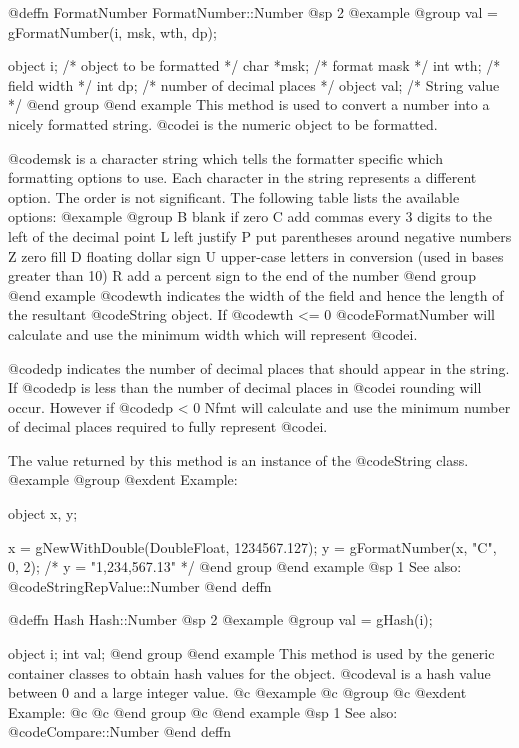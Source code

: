 @deffn {FormatNumber} FormatNumber::Number
@sp 2
@example
@group
val = gFormatNumber(i, msk, wth, dp);

object  i;      /*  object to be formatted      */
char    *msk;   /*  format mask                 */
int     wth;    /*  field width                 */
int     dp;     /*  number of decimal places    */
object  val;    /*  String value                */
@end group
@end example
This method is used to convert a number into a nicely formatted string.
@code{i} is the numeric object to be formatted.

@code{msk} is a character string which tells the formatter specific
which formatting options to use.  Each character in the string
represents a different option.  The order is not significant.  The
following table lists the available options:
@example
@group
B   blank if zero
C   add commas every 3 digits to the left of the decimal point
L   left justify
P   put parentheses around negative numbers
Z   zero fill
D   floating dollar sign
U   upper-case letters in conversion (used in bases greater
    than 10)
R   add a percent sign to the end of the number
@end group
@end example
@code{wth} indicates the width of the field and hence the length of the
resultant @code{String} object.  If @code{wth} <= 0 @code{FormatNumber} will
calculate and use the minimum width which will represent @code{i}.

@code{dp} indicates the number of decimal places that should appear in
the string.  If @code{dp} is less than the number of decimal places in
@code{i} rounding will occur.  However if @code{dp} < 0 Nfmt will
calculate and use the minimum number of decimal places required to fully
represent @code{i}.

The value returned by this method is an instance of the @code{String} class.
@example
@group
@exdent Example:

object  x, y;

x = gNewWithDouble(DoubleFloat, 1234567.127);
y = gFormatNumber(x, "C", 0, 2);    /*  y = "1,234,567.13"  */
@end group
@end example
@sp 1
See also:  @code{StringRepValue::Number}
@end deffn











@deffn {Hash} Hash::Number
@sp 2
@example
@group
val = gHash(i);

object  i;
int     val;
@end group
@end example
This method is used by the generic container classes to obtain hash values
for the object.  @code{val} is a hash value between 0 and a large integer
value.
@c @example
@c @group
@c @exdent Example:
@c
@c @end group
@c @end example
@sp 1
See also:  @code{Compare::Number}
@end deffn











